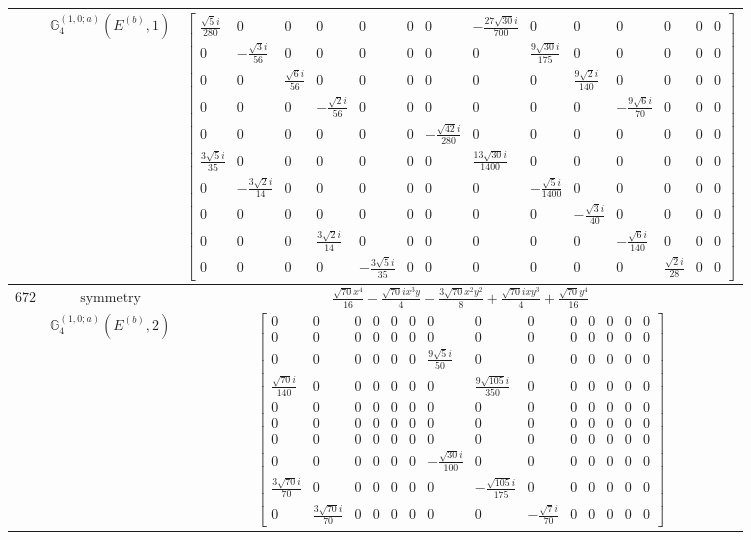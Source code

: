 \documentclass[fleqn,8pt,landscape]{jsarticle}
\begin{document}
\begin{longtable}{ccc}
$  $ & $ \mathbb{G}_{4}^{(1,0;a)}(E^{(b)},1) $ & $ \begin{bmatrix} \frac{\sqrt{5} i}{280} & 0 & 0 & 0 & 0 & 0 & 0 & - \frac{27 \sqrt{30} i}{700} & 0 & 0 & 0 & 0 & 0 & 0 \\ 0 & - \frac{\sqrt{3} i}{56} & 0 & 0 & 0 & 0 & 0 & 0 & \frac{9 \sqrt{30} i}{175} & 0 & 0 & 0 & 0 & 0 \\ 0 & 0 & \frac{\sqrt{6} i}{56} & 0 & 0 & 0 & 0 & 0 & 0 & \frac{9 \sqrt{2} i}{140} & 0 & 0 & 0 & 0 \\ 0 & 0 & 0 & - \frac{\sqrt{2} i}{56} & 0 & 0 & 0 & 0 & 0 & 0 & - \frac{9 \sqrt{6} i}{70} & 0 & 0 & 0 \\ 0 & 0 & 0 & 0 & 0 & 0 & - \frac{\sqrt{42} i}{280} & 0 & 0 & 0 & 0 & 0 & 0 & 0 \\ \frac{3 \sqrt{5} i}{35} & 0 & 0 & 0 & 0 & 0 & 0 & \frac{13 \sqrt{30} i}{1400} & 0 & 0 & 0 & 0 & 0 & 0 \\ 0 & - \frac{3 \sqrt{2} i}{14} & 0 & 0 & 0 & 0 & 0 & 0 & - \frac{\sqrt{5} i}{1400} & 0 & 0 & 0 & 0 & 0 \\ 0 & 0 & 0 & 0 & 0 & 0 & 0 & 0 & 0 & - \frac{\sqrt{3} i}{40} & 0 & 0 & 0 & 0 \\ 0 & 0 & 0 & \frac{3 \sqrt{2} i}{14} & 0 & 0 & 0 & 0 & 0 & 0 & - \frac{\sqrt{6} i}{140} & 0 & 0 & 0 \\ 0 & 0 & 0 & 0 & - \frac{3 \sqrt{5} i}{35} & 0 & 0 & 0 & 0 & 0 & 0 & \frac{\sqrt{2} i}{28} & 0 & 0 \end{bmatrix} $ \\ \hline
$ 672 $ & $ \text{symmetry} $ & $ \frac{\sqrt{70} x^{4}}{16} - \frac{\sqrt{70} i x^{3} y}{4} - \frac{3 \sqrt{70} x^{2} y^{2}}{8} + \frac{\sqrt{70} i x y^{3}}{4} + \frac{\sqrt{70} y^{4}}{16} $ \\
$  $ & $ \mathbb{G}_{4}^{(1,0;a)}(E^{(b)},2) $ & $ \begin{bmatrix} 0 & 0 & 0 & 0 & 0 & 0 & 0 & 0 & 0 & 0 & 0 & 0 & 0 & 0 \\ 0 & 0 & 0 & 0 & 0 & 0 & 0 & 0 & 0 & 0 & 0 & 0 & 0 & 0 \\ 0 & 0 & 0 & 0 & 0 & 0 & \frac{9 \sqrt{5} i}{50} & 0 & 0 & 0 & 0 & 0 & 0 & 0 \\ \frac{\sqrt{70} i}{140} & 0 & 0 & 0 & 0 & 0 & 0 & \frac{9 \sqrt{105} i}{350} & 0 & 0 & 0 & 0 & 0 & 0 \\ 0 & 0 & 0 & 0 & 0 & 0 & 0 & 0 & 0 & 0 & 0 & 0 & 0 & 0 \\ 0 & 0 & 0 & 0 & 0 & 0 & 0 & 0 & 0 & 0 & 0 & 0 & 0 & 0 \\ 0 & 0 & 0 & 0 & 0 & 0 & 0 & 0 & 0 & 0 & 0 & 0 & 0 & 0 \\ 0 & 0 & 0 & 0 & 0 & 0 & - \frac{\sqrt{30} i}{100} & 0 & 0 & 0 & 0 & 0 & 0 & 0 \\ \frac{3 \sqrt{70} i}{70} & 0 & 0 & 0 & 0 & 0 & 0 & - \frac{\sqrt{105} i}{175} & 0 & 0 & 0 & 0 & 0 & 0 \\ 0 & \frac{3 \sqrt{70} i}{70} & 0 & 0 & 0 & 0 & 0 & 0 & - \frac{\sqrt{7} i}{70} & 0 & 0 & 0 & 0 & 0 \end{bmatrix} $ \\ \hline

\end{longtable}
\end{document}
